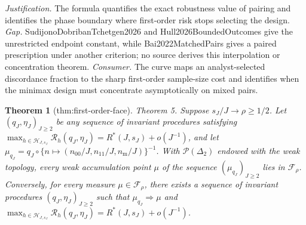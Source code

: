 \documentclass{article}
\newtheorem{theorem}{Theorem}
\begin{document}
\par\smallskip\noindent \textit{Justification.} The formula quantifies the exact robustness value of pairing and identifies the phase boundary where first-order risk stops selecting the design. \textit{Gap.} SudijonoDobribanTchetgen2026 and Hull2026BoundedOutcomes give the unrestricted endpoint constant, while Bai2022MatchedPairs gives a paired prescription under another criterion; no source derives this interpolation or concentration theorem. \textit{Consumer.} The curve maps an analyst-selected discordance fraction to the sharp first-order sample-size cost and identifies when the minimax design must concentrate asymptotically on mixed pairs.

\begin{theorem}[thm:first-order-face]\label{thm:first-order-face}
Theorem 5. Suppose \(s_J/J\to\rho\ge1/2\). Let \((q_J,\eta_J)_{J\ge2}\) be any sequence of invariant procedures satisfying \(\max_{h\in\mathcal H_{J,s_J}}\mathcal R_h(q_J,\eta_J)=R^*(J,s_J)+o(J^{-1})\), and let \(\mu_{q_J}=q_J\circ\{n\mapsto(n_{00}/J,n_{11}/J,n_{\mathrm m}/J)\}^{-1}\). With \(\mathcal P(\Delta_2)\) endowed with the weak topology, every weak accumulation point \(\mu\) of the sequence \((\mu_{q_J})_{J\ge2}\) lies in \(\mathcal F_\rho\). Conversely, for every measure \(\mu\in\mathcal F_\rho\), there exists a sequence of invariant procedures \((q_J,\eta_J)_{J\ge2}\) such that \(\mu_{q_J}\Rightarrow\mu\) and \(\max_{h\in\mathcal H_{J,s_J}}\mathcal R_h(q_J,\eta_J)=R^*(J,s_J)+o(J^{-1})\).
\end{theorem}
\end{document}
